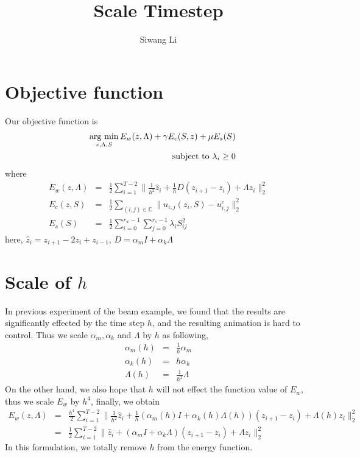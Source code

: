 \documentclass[9pt,twocolumn]{extarticle}
\author{Siwang Li}
\title{Scale Timestep}
\newcommand{\argmin}{\operatornamewithlimits{arg\ min}}
\begin{document}
\maketitle

\setlength{\parskip}{0.5ex}

\section{Objective function}
Our objective function is
\begin{eqnarray}\label{mtl-opt}
  &&\argmin_{z,\Lambda,S} E_w(z,\Lambda)+\gamma E_c(S,z)+\mu E_s(S)\\
  &&\mbox {subject to } \lambda_i \ge 0
\end{eqnarray}
where
\begin{eqnarray}\label{energies}
  E_w(z,\Lambda) &=& \frac{1}{2}\sum_{i=1}^{T-2}
  \|\frac{1}{h^2}\hat{z}_{i}+\frac{1}{h}D(z_{i+1}-z_{i})+
  \Lambda z_i\|_2^2\\
  E_c(z,S) &=& \frac{1}{2}\sum_{(i,j)\in \mathbb{C}}\|u_{i,j}(z_i,S)-u^c_{i,j}\|_2^2\\
  E_s(S) &=& \frac{1}{2}\sum_{i=0}^{r_w-1}\sum_{j=0}^{r_s-1}\lambda_i S^2_{i j}
\end{eqnarray}
here, $\hat{z}_i = z_{i+1}-2z_{i}+z_{i-1}$, $D=\alpha_mI+\alpha_k\Lambda$

\section{Scale of $h$}
In previous experiment of the beam example, we found that the results are
significantly effected by the time step $h$, and the resulting animation is
hard to control. Thus we scale $\alpha_m,\alpha_k$ and $\Lambda$ by $h$ as
following,
\begin{eqnarray}
 \alpha_m(h) &=& \frac{1}{h}\alpha_m  \\
 \alpha_k(h) &=& h\alpha_k  \\
 \Lambda(h) &=& \frac{1}{h^2}\Lambda
\end{eqnarray}
On the other hand, we also hope that $h$ will not effect the function value of
$E_w$, thus we scale $E_w$ by $h^4$, finally, we obtain
\begin{eqnarray}
  E_w(z,\Lambda)&=&\frac{h^4}{2}\sum_{i=1}^{T-2}\|\frac{1}{h^2}\hat{z}_{i}+\frac{1}{h}(\alpha_m(h)I+\alpha_k(h)\Lambda(h))(z_{i+1}-z_{i})+\Lambda(h)
  z_i\|_2^2 \nonumber\\
  &=&\frac{1}{2}\sum_{i=1}^{T-2}\|\hat{z}_{i}+(\alpha_mI+\alpha_k\Lambda)(z_{i+1}-z_{i})+\Lambda
  z_i\|_2^2
\end{eqnarray}
In this formulation, we totally remove $h$ from the energy function. 
\end{document}
